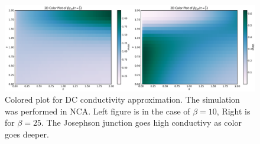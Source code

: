 \documentclass{article}[12pt]
\begin{document}
\begin{spacing}{1.5}
\begin{figure}[H]
  \centerline{\includegraphics[width=16cm]{TexFigure/chi_color.png}}
  \caption{Colored plot for DC conductivity approximation. The simulation was performed in NCA. Left figure is in the case of $\beta=10$, Right is for $\beta=25$.
  The Josephson junction goes high conductivy as color goes deeper.}
\end{figure}
\pagebreak

\end{spacing}
\end{document}

